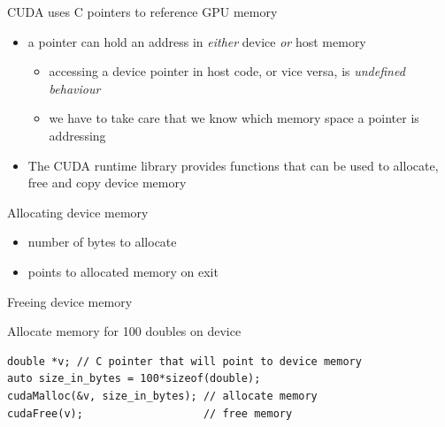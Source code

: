 \begin{frame}[fragile]{}
    \begin{info}{CUDA uses C pointers to reference GPU memory}
        \centering {}
        \begin{itemize}
            \item a pointer can hold an address in \emph{either} device \emph{or} host memory
            \begin{itemize}
                \item accessing a device pointer in host code, or vice versa, is \emph{undefined behaviour}
                \item we have to take care that we know which memory space a pointer is addressing
            \end{itemize}
            \item The CUDA runtime library provides functions that can be used to allocate, free and copy device memory
        \end{itemize}
    \end{info}

\end{frame}

\begin{frame}[fragile]{}
    \begin{info}{Allocating device memory}
        \centering {}
    \begin{itemize}
        \item {} number of bytes to allocate
        \item {} points to allocated memory on exit
    \end{itemize}
    \end{info}

    \begin{info}{Freeing device memory}
        \centering {}
    \end{info}

    \begin{code}{Allocate memory for 100 doubles on device}
        \begin{lstlisting}[style=boxcuda]
double *v; // C pointer that will point to device memory
auto size_in_bytes = 100*sizeof(double);
cudaMalloc(&v, size_in_bytes); // allocate memory
cudaFree(v);                   // free memory
\end{lstlisting}
    \end{code}
\end{frame}

